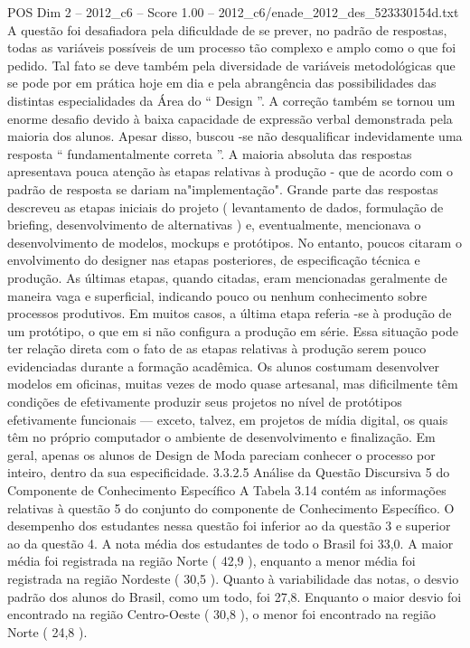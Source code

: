 \begin{textsample}{POS Dim 2 – 2012\_c6 – Score 1.00 – 2012\_c6/enade\_2012\_des\_523330154d.txt}
A questão foi desafiadora pela dificuldade de se prever, no padrão de respostas, todas as variáveis possíveis de um processo tão complexo e amplo como o que foi pedido.
Tal fato se deve também pela diversidade de variáveis metodológicas que se pode por em prática hoje em dia e pela abrangência das possibilidades das distintas especialidades da Área do “ Design ”.
A correção também se tornou um enorme desafio devido à baixa capacidade de expressão verbal demonstrada pela maioria dos alunos.
Apesar disso, buscou -se não desqualificar indevidamente uma resposta “ fundamentalmente correta ”.
A maioria absoluta das respostas apresentava pouca atenção às etapas relativas à produção - que de acordo com o padrão de resposta se dariam na"implementação".
Grande parte das respostas descreveu as etapas iniciais do projeto ( levantamento de dados, formulação de briefing, desenvolvimento de alternativas ) e, eventualmente, mencionava o desenvolvimento de modelos, mockups e protótipos.
No entanto, poucos citaram o envolvimento do designer nas etapas posteriores, de especificação técnica e produção.
As últimas etapas, quando citadas, eram mencionadas geralmente de maneira vaga e superficial, indicando pouco ou nenhum conhecimento sobre processos produtivos.
Em muitos casos, a última etapa referia -se à produção de um protótipo, o que em si não configura a produção em série.
Essa situação pode ter relação direta com o fato de as etapas relativas à produção serem pouco evidenciadas durante a formação acadêmica.
Os alunos costumam desenvolver modelos em oficinas, muitas vezes de modo quase artesanal, mas dificilmente têm condições de efetivamente produzir seus projetos no nível de protótipos efetivamente funcionais — exceto, talvez, em projetos de mídia digital, os quais têm no próprio computador o ambiente de desenvolvimento e finalização.
Em geral, apenas os alunos de Design de Moda pareciam conhecer o processo por inteiro, dentro da sua especificidade. 3.3.2.5 Análise da Questão Discursiva 5 do Componente de Conhecimento Específico A Tabela 3.14 contém as informações relativas à questão 5 do conjunto do componente de Conhecimento Específico.
O desempenho dos estudantes nessa questão foi inferior ao da questão 3 e superior ao da questão 4.
A nota média dos estudantes de todo o Brasil foi 33,0.
A maior média foi registrada na região Norte ( 42,9 ), enquanto a menor média foi registrada na região Nordeste ( 30,5 ).
Quanto à variabilidade das notas, o desvio padrão dos alunos do Brasil, como um todo, foi 27,8.
Enquanto o maior desvio foi encontrado na região Centro-Oeste ( 30,8 ), o menor foi encontrado na região Norte ( 24,8 ).

\end{textsample}
